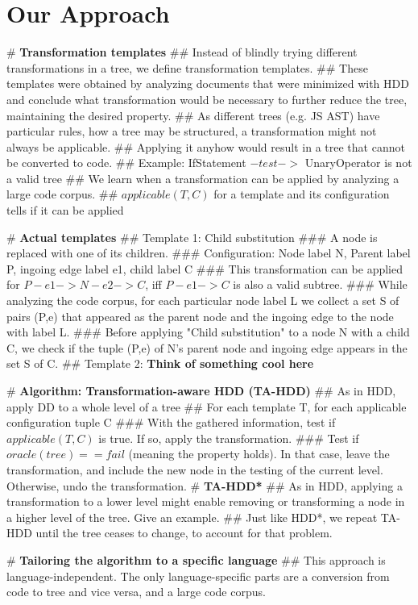 \documentclass[numbers]{sigplanconf}
\begin{document}
\section{Our Approach}
\label{sec_approach}

\begin{easylist}[itemize]
# \textbf{Transformation templates}
## Instead of blindly trying different transformations in a tree, we define transformation templates.
## These templates were obtained by analyzing documents that were minimized with HDD and conclude what transformation would be necessary to further reduce the tree, maintaining the desired property.
## As different trees (e.g. JS AST) have particular rules, how a tree may be structured, a transformation might not always be applicable.
## Applying it anyhow would result in a tree that cannot be converted to code.
## Example: IfStatement $-test->$ UnaryOperator is not a valid tree
## We learn when a transformation can be applied by analyzing a large code corpus.
## $applicable(T, C)$ for a template and its configuration tells if it can be applied

# \textbf{Actual templates}
## Template 1: Child substitution
### A node is replaced with one of its children.
### Configuration: Node label N, Parent label P, ingoing edge label e1, child label C
### This transformation can be applied for $P-e1->N-e2->C$, iff $P-e1->C$ is also a valid subtree.
### While analyzing the code corpus, for each particular node label L we collect a set S of pairs (P,e) that appeared as the parent node and the ingoing edge to the node with label L.
### Before applying "Child substitution" to a node N with a child C, we check if the tuple (P,e) of N's parent node and ingoing edge appears in the set S of C.
## Template 2: \textbf{Think of something cool here}

# \textbf{Algorithm: Transformation-aware HDD (TA-HDD)}
## As in HDD, apply DD to a whole level of a tree
## For each template T, for each applicable configuration tuple C
### With the gathered information, test if $applicable(T, C)$ is true. If so, apply the transformation.
### Test if $oracle(tree) == fail$ (meaning the property holds). In that case, leave the transformation, and include the new node in the testing of the current level. Otherwise, undo the transformation.
# \textbf{TA-HDD*}
## As in HDD, applying a transformation to a lower level might enable removing or transforming a node in a higher level of the tree. Give an example.
## Just like HDD*, we repeat TA-HDD until the tree ceases to change, to account for that problem.

# \textbf{Tailoring the algorithm to a specific language}
## This approach is language-independent. The only language-specific parts are a conversion from code to tree and vice versa, and a large code corpus.
\end{easylist}
\end{document}

